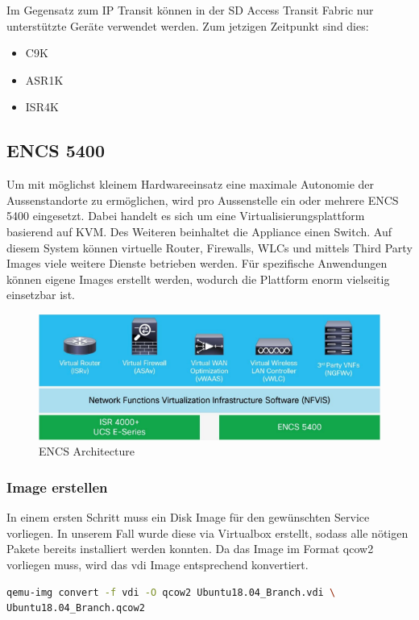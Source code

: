 Im Gegensatz zum IP Transit können in der SD Access Transit Fabric nur unterstützte Geräte verwendet werden. Zum jetzigen Zeitpunkt sind dies:
\begin{itemize}
	\item C9K
	\item ASR1K
	\item ISR4K 
\end{itemize}

\subsection{ENCS 5400}

Um mit möglichst kleinem Hardwareeinsatz eine maximale Autonomie der Aussenstandorte zu ermöglichen, wird pro Aussenstelle ein oder mehrere ENCS 5400 eingesetzt. 
Dabei handelt es sich um eine Virtualisierungsplattform basierend auf KVM. Des Weiteren beinhaltet die Appliance einen Switch. 
Auf diesem System können virtuelle Router, Firewalls, WLCs und mittels Third Party Images viele weitere Dienste betrieben werden. Für spezifische Anwendungen können eigene Images erstellt werden, wodurch die Plattform enorm vielseitig einsetzbar ist.

\begin{figure}[H]
	\centering
	\includegraphics[width=0.8\linewidth]{img/Absicherung/ENCS_Architecture.png}
	\caption{ENCS Architecture \cite{enterprise-network-functions-virtualization-faq} }
	\label{fig:ENCS Architecture}
\end{figure}

\subsubsection{Image erstellen}

In einem ersten Schritt muss ein Disk Image für den gewünschten Service vorliegen. In unserem Fall wurde diese via Virtualbox erstellt, sodass alle nötigen Pakete bereits installiert werden konnten. Da das Image im Format qcow2 vorliegen muss, wird das vdi Image entsprechend konvertiert.

\begin{lstlisting}[language=bash]
qemu-img convert -f vdi -O qcow2 Ubuntu18.04_Branch.vdi \
Ubuntu18.04_Branch.qcow2
\end{lstlisting}

